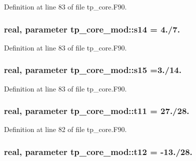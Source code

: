 Definition at line 83 of file tp\-\_\-core.\-F90.

\subsubsection[{s14}]{\setlength{\rightskip}{0pt plus 5cm}real, parameter tp\-\_\-core\-\_\-mod\-::s14 = 4./7.\hspace{0.3cm}{\ttfamily [private]}}\label{classtp__core__mod_a3e606f8de1699c471fdb95289df0e033}


Definition at line 83 of file tp\-\_\-core.\-F90.

\subsubsection[{s15}]{\setlength{\rightskip}{0pt plus 5cm}real, parameter tp\-\_\-core\-\_\-mod\-::s15 =3./14.\hspace{0.3cm}{\ttfamily [private]}}\label{classtp__core__mod_aa0b566db71890d0741be14cb78f1b803}


Definition at line 83 of file tp\-\_\-core.\-F90.

\subsubsection[{t11}]{\setlength{\rightskip}{0pt plus 5cm}real, parameter tp\-\_\-core\-\_\-mod\-::t11 = 27./28.\hspace{0.3cm}{\ttfamily [private]}}\label{classtp__core__mod_aaad141ba3705e5defdbaa59ece28c51f}


Definition at line 82 of file tp\-\_\-core.\-F90.

\subsubsection[{t12}]{\setlength{\rightskip}{0pt plus 5cm}real, parameter tp\-\_\-core\-\_\-mod\-::t12 = -\/13./28.\hspace{0.3cm}{\ttfamily [private]}}\label{classtp__core__mod_a5f8e8b3c382dd0f93a01a0968b4d290c}


